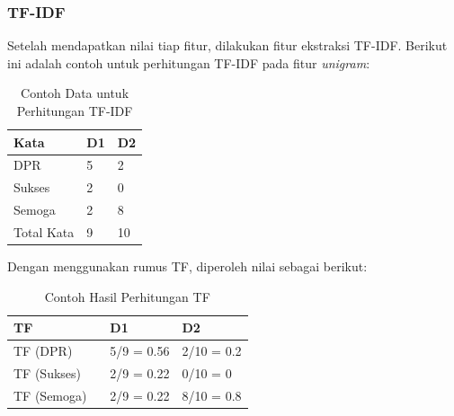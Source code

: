 \subsubsection{TF-IDF}
Setelah mendapatkan nilai tiap fitur, dilakukan fitur ekstraksi TF-IDF. Berikut ini adalah contoh untuk perhitungan TF-IDF pada fitur \textit{unigram}:
\begin{table}[H]
	\caption{Contoh Data untuk Perhitungan TF-IDF}
	\centering
	\small
	\begin{adjustbox}{width=1\textwidth}
	\begin{tabular}{|p{6cm}|p{3.25cm}|p{3.25cm}|}
		\hline
		\textbf{Kata} & \textbf{D1} & \textbf{D2} \\
		\hline
		DPR & 5 & 2 \\
		\hline
		Sukses & 2 & 0 \\
		\hline
		Semoga & 2 & 8 \\
		\hline
		Total Kata & 9 & 10 \\
		\hline
	\end{tabular}
	\end{adjustbox}
\end{table}
\noindent Dengan menggunakan rumus TF, diperoleh nilai sebagai berikut:
\begin{table}[H]
	\caption{Contoh Hasil Perhitungan TF}
	\centering
	\small
	\begin{adjustbox}{width=1\textwidth}
	\begin{tabular}{|p{6cm}|p{3.25cm}|p{3.25cm}|}
		\hline
		\textbf{TF} & \textbf{D1} & \textbf{D2} \\
		\hline
		 TF (DPR)\ \ \ \ & 5/9 = 0.56 & 2/10 = 0.2 \\
		\hline
		TF (Sukses) & 2/9 = 0.22 & 0/10 = 0 \\
		\hline
		TF (Semoga) & 2/9 = 0.22 & 8/10 = 0.8 \\
		\hline
	\end{tabular}
	\end{adjustbox}
\end{table}

